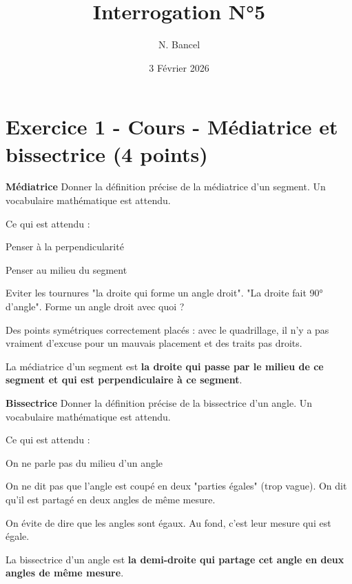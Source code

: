 \documentclass[answers]{exam}
\title{Interrogation N°5}
\author{N. Bancel}
\date{3 Février 2026}
\begin{document}
{\let\newpage\relax\maketitle}

\section*{Exercice 1 - Cours - Médiatrice et bissectrice (4 points)}

\begin{questions}
  \question[2] \textbf{Médiatrice} Donner la définition précise de la médiatrice d’un segment. Un vocabulaire mathématique est attendu.
  \begin{solution}
          \begin{Indication}

Ce qui est attendu : 
\begin{compactitem}
\item Penser à la perpendicularité
\item Penser au milieu du segment
\item Eviter les tournures "la droite qui forme un angle droit". "La droite fait 90° d'angle". Forme un angle droit avec quoi ?
\item Des points symétriques correctement placés : avec le quadrillage, il n'y a pas vraiment d'excuse pour un mauvais placement et des traits pas droits.
\end{compactitem}

      \end{Indication}
      La médiatrice d’un segment est \textbf{la droite qui passe par le milieu de ce segment et qui est perpendiculaire à ce segment}.
      \end{solution}
  \question[2] \textbf{Bissectrice} Donner la définition précise de la bissectrice d’un angle. Un vocabulaire mathématique est attendu.
      \begin{solution}
                  \begin{Indication}

Ce qui est attendu : 
\begin{compactitem}
\item On ne parle pas du milieu d'un angle  
\item On ne dit pas que l'angle est coupé en deux "parties égales" (trop vague). On dit qu'il est partagé en deux angles de même mesure.
\item On évite de dire que les angles sont égaux. Au fond, c'est leur mesure qui est égale.
\end{compactitem}

      \end{Indication}   
      La bissectrice d’un angle est \textbf{la demi-droite qui partage cet angle en deux angles de même mesure}.
    \end{solution}
  \end{questions}
\end{document}

